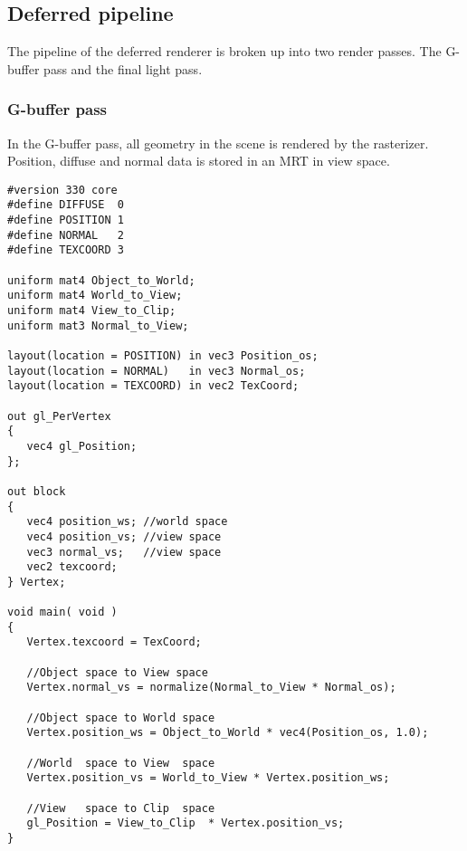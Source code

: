 \subsection{Deferred pipeline}
The pipeline of the deferred renderer is broken up into two render passes. The G-buffer pass and the final light pass.

\subsubsection{G-buffer pass}
In the G-buffer pass, all geometry in the scene is rendered by the rasterizer. Position, diffuse and normal data is stored in an MRT in view space.

\begin{lstlisting}
#version 330 core
#define DIFFUSE  0
#define POSITION 1
#define NORMAL   2
#define TEXCOORD 3

uniform mat4 Object_to_World;
uniform mat4 World_to_View;
uniform mat4 View_to_Clip;
uniform mat3 Normal_to_View;

layout(location = POSITION) in vec3 Position_os;
layout(location = NORMAL)   in vec3 Normal_os;
layout(location = TEXCOORD) in vec2 TexCoord;

out gl_PerVertex
{
   vec4 gl_Position;
};

out block
{
   vec4 position_ws; //world space
   vec4 position_vs; //view space
   vec3 normal_vs;   //view space
   vec2 texcoord;
} Vertex;

void main( void )
{	
   Vertex.texcoord = TexCoord;
	
   //Object space to View space
   Vertex.normal_vs = normalize(Normal_to_View * Normal_os);
	
   //Object space to World space
   Vertex.position_ws = Object_to_World * vec4(Position_os, 1.0);
	
   //World  space to View  space
   Vertex.position_vs = World_to_View * Vertex.position_ws;
	
   //View   space to Clip  space
   gl_Position = View_to_Clip  * Vertex.position_vs;
}
\end{lstlisting}

